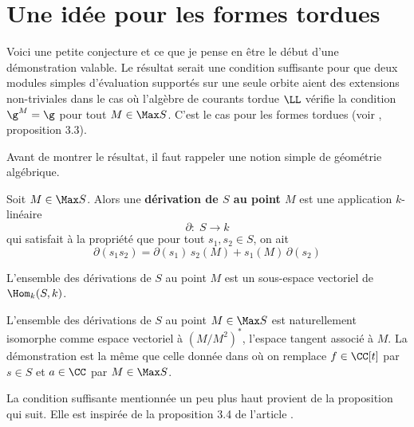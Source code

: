 \chapter{Une idée pour les formes tordues}

Voici une petite conjecture et ce que je pense en être le début d'une démonstration valable. Le résultat serait une condition suffisante pour que deux modules simples d'évaluation supportés sur une seule orbite aient des extensions non-triviales dans le cas où l'algèbre de courants tordue $\LL$ vérifie la condition $\g^M = \g$ pour tout $M \in \Max S$. C'est le cas pour les formes tordues (voir \cite{LPtfa}, proposition 3.3).

Avant de montrer le résultat, il faut rappeler une notion simple de géométrie algébrique.

\begin{annexeDef} Soit $M \in \Max S$. Alors une \textbf{dérivation de $S$ au point $M$} est une application $k$-linéaire 
$$ \partial : \; S \longrightarrow k $$
qui satisfait à la propriété que pour tout $s_1,s_2 \in S$, on ait 
$$ \partial(s_1s_2) = \partial(s_1) \, s_2(M) + s_1(M) \, \partial(s_2) $$

L'ensemble des dérivations de $S$ au point $M$ est un sous-espace vectoriel de $\Hom_k(S,k)$.
\end{annexeDef}

L'ensemble des dérivations de $S$ au point $M \in \Max S$ est naturellement isomorphe comme espace vectoriel à $(M/M^2)^*$, l'espace tangent associé à $M$. La démonstration est la même que celle donnée dans \cite{GWsym} où on remplace $f \in \CC[t]$ par $s \in S$ et $a \in \CC$ par $M \in \Max S$.

La condition suffisante mentionnée un peu plus haut provient de la proposition qui suit. Elle est inspirée de la proposition 3.4 de l'article \cite{CMspec}.

